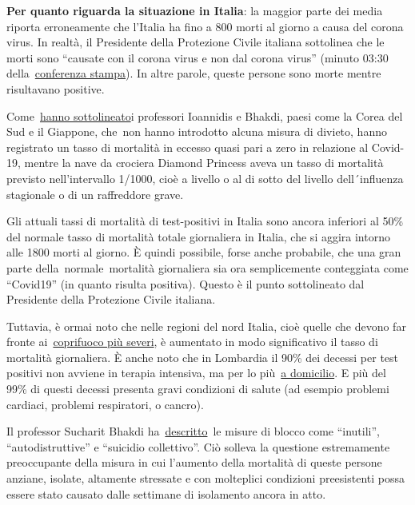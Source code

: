 \textbf{Per quanto riguarda la situazione in Italia}: la maggior parte
dei media riporta erroneamente che l'Italia ha fino a 800 morti al
giorno a causa del corona virus. In realtà, il Presidente della
Protezione Civile italiana sottolinea che le morti sono ``causate con il
corona virus e non dal corona virus'' (minuto 03:30
della~\href{https://youtu.be/0M4kbPDHGR0?t=210}{conferenza stampa}). In
altre parole, queste persone sono morte mentre risultavano positive.

Come~\href{https://www.statnews.com/2020/03/17/a-fiasco-in-the-making-as-the-coronavirus-pandemic-takes-hold-we-are-making-decisions-without-reliable-data/}{hanno
sottolineato}i professori Ioannidis e Bhakdi, paesi come la Corea del
Sud e il Giappone, che~non hanno introdotto alcuna misura di divieto,
hanno registrato un tasso di mortalità in eccesso quasi pari a zero in
relazione al Covid-19, mentre la nave da crociera Diamond Princess aveva
un tasso di mortalità previsto nell'intervallo 1/1000, cioè a livello o
al di sotto del livello dell´influenza stagionale o di un raffreddore
grave.

Gli attuali tassi di mortalità di test-positivi in Italia sono ancora
inferiori al 50\% del normale tasso di mortalità totale giornaliera in
Italia, che si aggira intorno alle 1800 morti al giorno. È quindi
possibile, forse anche probabile, che una gran parte
della~normale~mortalità giornaliera sia ora semplicemente conteggiata
come ``Covid19'' (in quanto risulta positiva). Questo è il punto
sottolineato dal Presidente della Protezione Civile italiana.

Tuttavia, è ormai noto che nelle regioni del nord Italia, cioè quelle
che devono far fronte
ai~\href{https://en.wikipedia.org/wiki/2020_Italy_coronavirus_lockdown}{coprifuoco
più severi}, è aumentato in modo significativo il tasso di mortalità
giornaliera. È anche noto che in Lombardia il 90\% dei decessi per test
positivi non avviene in terapia intensiva, ma per lo
più~\href{https://www.tgcom24.mediaset.it/cronaca/coronavirus-in-lombardia-9-morti-su-10-mai-giunti-in-terapia-intensiva_16362350-202002a.shtml}{a
domicilio}. E più del 99\% di questi decessi presenta gravi condizioni
di salute (ad esempio problemi cardiaci, problemi respiratori, o
cancro).

Il professor Sucharit Bhakdi
ha~\href{https://www.youtube.com/watch?v=JBB9bA-gXL4}{descritto}~le
misure di blocco come ``inutili'', ``autodistruttive'' e ``suicidio
collettivo''. Ciò solleva la questione estremamente preoccupante della
misura in cui l'aumento della mortalità di queste persone anziane,
isolate, altamente stressate e con molteplici condizioni preesistenti
possa essere stato causato dalle settimane di isolamento ancora in atto.


